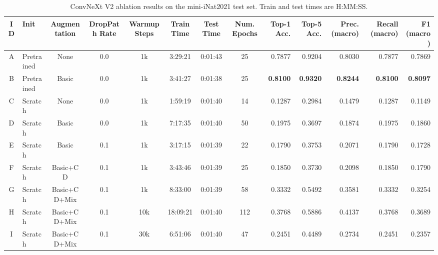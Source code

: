 \begin{table}[t]
  \centering
  \caption{ConvNeXt V2 ablation results on the mini-iNat2021 test set. Train and test times are H:MM:SS.
  }
  \label{tab:main-results}
  \setlength{\tabcolsep}{2.5pt}
  \scriptsize
  \begin{tabular}{@{}clccccccrrrrr@{}}
    \toprule
    ID & Init            & Augmentation    & DropPath Rate   & Warmup Steps    & Train Time      & Test Time & Num. Epochs
       & Top-1 Acc.      & Top-5 Acc.      & Prec. (macro)   & Recall (macro)  & F1 (macro)                                \\
    \midrule
    A  & Pretrained      & None            & 0.0             & 1k              & 3:29:21         & 0:01:43   & 25
       & 0.7877          & 0.9204          & 0.8030          & 0.7877          & 0.7869                                    \\
    B  & Pretrained      & Basic           & 0.0             & 1k              & 3:41:27         & 0:01:38   & 25
       & \textbf{0.8100} & \textbf{0.9320} & \textbf{0.8244} & \textbf{0.8100} & \textbf{0.8097}                           \\
    C  & Scratch         & None            & 0.0             & 1k              & 1:59:19         & 0:01:40   & 14
       & 0.1287          & 0.2984          & 0.1479          & 0.1287          & 0.1149                                    \\
    D  & Scratch         & Basic           & 0.0             & 1k              & 7:17:35         & 0:01:40   & 50
       & 0.1975          & 0.3697          & 0.1874          & 0.1975          & 0.1860                                    \\
    E  & Scratch         & Basic           & 0.1             & 1k              & 3:17:15         & 0:01:39   & 22
       & 0.1790          & 0.3753          & 0.2071          & 0.1790          & 0.1728                                    \\
    F  & Scratch         & Basic+CD        & 0.1             & 1k              & 3:43:46         & 0:01:39   & 25
       & 0.1850          & 0.3730          & 0.2098          & 0.1850          & 0.1790                                    \\
    G  & Scratch         & Basic+CD+Mix    & 0.1             & 1k              & 8:33:00         & 0:01:39   & 58
       & 0.3332          & 0.5492          & 0.3581          & 0.3332          & 0.3254                                    \\
    H  & Scratch         & Basic+CD+Mix    & 0.1             & 10k             & 18:09:21        & 0:01:40   & 112
       & 0.3768          & 0.5886          & 0.4137          & 0.3768          & 0.3689                                    \\
    I  & Scratch         & Basic+CD+Mix    & 0.1             & 30k             & 6:51:06         & 0:01:40   & 47
       & 0.2451          & 0.4489          & 0.2734          & 0.2451          & 0.2357                                    \\
    \bottomrule
  \end{tabular}
\end{table}


